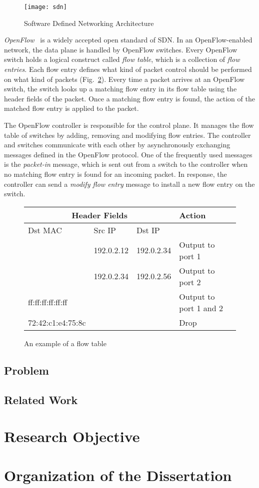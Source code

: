 \begin{figure}
    \centering
    \texttt{[image: sdn]}
    \caption{Software Defined Networking Architecture}%
    \label{fig:sdn-architecture}
\end{figure}

\emph{OpenFlow}~\autocite{McKeown2008} is a widely accepted open
standard of SDN\@. In an OpenFlow-enabled network, the data plane is
handled by OpenFlow switches. Every OpenFlow switch holds a logical
construct called \emph{flow table}, which is a collection of \emph{flow
entries}. Each flow entry defines what kind of packet control should be
performed on what kind of packets (Fig.~\ref{tbl:flow-table}). Every
time a packet arrives at an OpenFlow switch, the switch looks up a
matching flow entry in its flow table using the header fields of the
packet. Once a matching flow entry is found, the action of the matched
flow entry is applied to the packet.

The OpenFlow controller is responsible for the control plane. It manages
the flow table of switches by adding, removing and modifying flow
entries. The controller and switches communicate with each other by
asynchronously exchanging messages defined in the OpenFlow protocol. One
of the frequently used messages is the \emph{packet-in} message, which
is sent out from a switch to the controller when no matching flow entry
is found for an incoming packet. In response, the controller can send a
\emph{modify flow entry} message to install a new flow entry on the
switch.

\begin{figure}
    \centering
    \begin{tabular}{lllll}
        \toprule
        \multicolumn{3}{c}{Header Fields}            &  Action                  \\ \midrule
        Dst MAC           & Src IP     & Dst IP      &                          \\ \midrule
                          & 192.0.2.12 & 192.0.2.34  & Output to port 1         \\
                          & 192.0.2.34 & 192.0.2.56  & Output to port 2         \\
        ff:ff:ff:ff:ff:ff &            &             & Output to port 1 and 2   \\
        72:42:c1:e4:75:8c &            &             & Drop                     \\
        \bottomrule
    \end{tabular}
    \caption{An example of a flow table}%
    \label{tbl:flow-table}
\end{figure}

\subsection{Problem}

\subsection{Related Work}

\section{Research Objective}

\section{Organization of the Dissertation}
